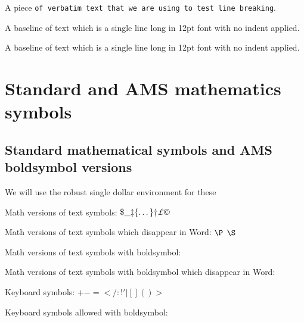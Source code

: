 \documentclass[12pt,a4paper]{article}
\theoremstyle{clearprint}
\begin{document}
\bigskip
A piece \verb=of verbatim text that we are using to test line breaking=.


\bigskip

\noindent
A baseline of text which is a single line long in 12pt font with no indent applied.

\vspace{4\baselineskip}

\noindent
A baseline of text which is a single line long in 12pt font with no indent applied.\marginpar{\rule[-1ex]{0.3em}{4ex}}

\newpage

\section[Standard/AMS maths symbols]{Standard and AMS mathematics symbols}
\setcounter{equation}{0}

\subsection[Standard/AMS normal/bold symbols]{Standard mathematical symbols\label{maths-symbols} and AMS boldsymbol versions}\setcounter{equation}{0}

We will use the robust single dollar environment for these

Math versions of text symbols: $\$  \_  \ddag  \{  \dots  \}  \dag  \pounds \copyright$

Math versions of text symbols which disappear in Word: $\P$  $\S$

Math versions of text symbols with boldsymbol: \boldsymbol{$\$  \_  \ddag  \{  \dots  \}  \dag  \pounds \copyright$}

Math versions of text symbols with boldsymbol which disappear in Word: \boldsymbol{$\P$  $\S$}

Keyboard symbols: $+  -  =  <   /  :  !  '  |  [  ]  (  ) > $ 

Keyboard symbols allowed with boldsymbol:  
\end{document}
